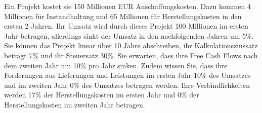 \question[16] Ein Projekt kostet sie 150 Millionen EUR Anschaffungskosten. Dazu kommen 4 Millionen für Instandhaltung und 65 Millionen für Herstellungskosten in den ersten 2 Jahren. Ihr Umsatz wird durch dieses Projekt 100 Millionen im ersten Jahr betragen, allerdings sinkt der Umsatz in den nachfolgenden Jahren um 5\%. Sie können das Projekt linear über 10 Jahre abschreiben, ihr Kalkulationszinssatz beträgt 7\% und ihr Steuersatz 30\%. Sie erwarten, dass ihre Free Cash Flows nach dem zweiten Jahr um 10\% pro Jahr sinken. Zudem wissen Sie, dass ihre Forderungen aus Lieferungen und Leistungen im ersten Jahr 10\% des Umsatzes und im zweiten Jahr 0\% des Umsatzes betragen werden. Ihre Verbindlichkeiten werden 17\% der Herstellungskosten im ersten Jahr und 0\% der Herstellungskosten im zweiten Jahr betragen.
